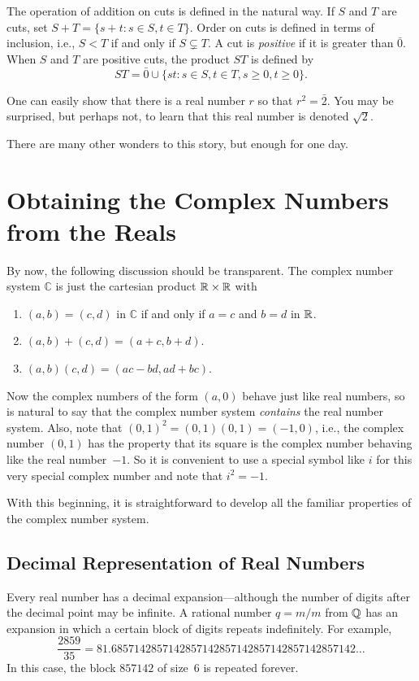 The operation of addition on cuts is defined in the natural
way.  If $S$ and $T$ are cuts, set $S+T=\{s+t:s\in S, t\in T\}$.
Order on cuts is defined in terms of inclusion, i.e., $S<T$ if and
only if $S\subsetneq T$.  A cut is \textit{positive} if it
is greater than $\bar{0}$.  When $S$ and $T$ are positive
cuts, the product $ST$ is defined by
\[
ST= \bar{0}\cup\{st:s\in S, t\in T, s\ge0, t\ge 0\}.
\]

One can easily show that there is a real number $r$ so that
$r^2=\bar{2}$.  You may be surprised, but perhaps not, to learn
that this real number is denoted $\sqrt2$.

There are many other wonders to this story, but enough for
one day.

\section{Obtaining the Complex Numbers from the Reals}

By now, the following discussion should be transparent.
The complex number system $\mathbb{C}$ is just the cartesian product
$\mathbb{R}\times\mathbb{R}$ with 
\begin{enumerate}
\item $(a,b) = (c,d)$ in $\mathbb{C}$ if and only if $a=c$ and $b=d$
in $\mathbb{R}$.
\item $(a,b)+(c,d)=(a+c,b+d)$.
\item $(a,b)(c,d)=(ac-bd, ad+bc)$.
\end{enumerate}

Now the complex numbers of the form $(a,0)$ behave just like
real numbers, so is natural to say that the complex number system
\textit{contains} the real number system.  Also, note that
$(0,1)^2=(0,1)(0,1)=(-1,0)$, i.e., the complex number $(0,1)$ has the
property that its square is the complex number behaving like the
real number~$-1$.  So it is convenient to use a special symbol like
$i$ for this very special complex number and note that $i^2=-1$.

With this beginning, it is straightforward to develop all the
familiar properties of the complex number system.

\subsection{Decimal Representation of Real Numbers}

Every real number has a decimal expansion---although the
number of digits after the decimal point may be infinite.
A rational number $q=m/m$ from $\mathbb{Q}$ has an expansion
in which a certain block of digits repeats indefinitely.
For example, \[
\frac{2859}{35} = 81.6857142857142857142857142857142857142857142\dots
\]
In this case, the block $857142$ of size~$6$ is repeated forever.

